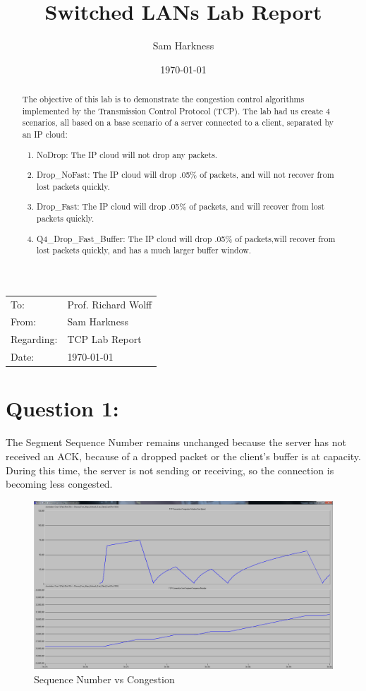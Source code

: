 \documentclass[letter,12pt]{article}
\title{Switched LANs Lab Report}
\author{Sam Harkness}
\date{\mydate\today}
\begin{document}

\begin{flushleft}
	\begin{tabular}{l l}
		To: & Prof. Richard Wolff \\
		From: & Sam Harkness \\
		Regarding: & TCP Lab Report \\
		Date: & \mydate\today
	\end{tabular}
\end{flushleft}



\begin{abstract}
	\noindent The objective of this lab is to demonstrate the congestion control algorithms implemented by the Transmission Control Protocol (TCP). The lab had us create 4 scenarios, all based on a base scenario of a server connected to a client, separated by an IP cloud:
	\begin{enumerate}
		\item NoDrop: The IP cloud will not drop any packets.
		\item Drop\_NoFast: The IP cloud will drop .05\% of packets, and will not recover from lost packets quickly.
		\item Drop\_Fast: The IP cloud will drop .05\% of packets, and will recover from lost packets quickly.
		\item Q4\_Drop\_Fast\_Buffer: The IP cloud will drop .05\% of packets,will recover from lost packets quickly, and has a much larger buffer window.
	\end{enumerate}
\end{abstract}

\section{Question 1:}
	The Segment Sequence Number remains unchanged because the server has not received an ACK, because of a dropped packet or the client's buffer is at capacity.  During this time, the server is not sending or receiving, so the connection is becoming less congested.

	\begin{figure}[h!]
		\centering
			\includegraphics[width=.9\textwidth]{SequenceNum_vs_Congestion.png}
		\caption{Sequence Number vs Congestion}
		\label{SequencyNum_vs_Congestion}
	\end{figure}
	
\end{document}
